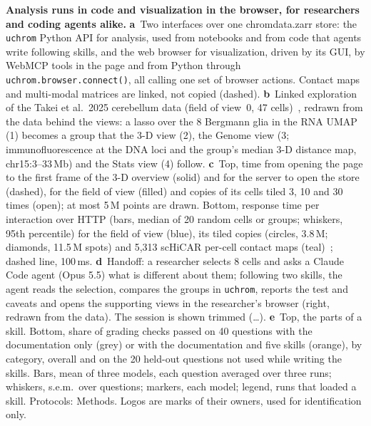 \textbf{Analysis runs in code and visualization in the browser, for researchers and coding agents alike.}
\textbf{a}~Two interfaces over one chromdata.zarr store: the \texttt{uchrom} Python API for analysis, used from notebooks and from code that agents write following skills, and the web browser for visualization, driven by its GUI, by WebMCP tools in the page and from Python through \texttt{uchrom.browser.connect()}, all calling one set of browser actions. Contact maps and multi-modal matrices are linked, not copied (dashed).
\textbf{b}~Linked exploration of the Takei et al.\ 2025 cerebellum data (field of view~0, 47 cells)~\citep{takei2025}, redrawn from the data behind the views: a lasso over the 8 Bergmann glia in the RNA UMAP (1) becomes a group that the 3-D view (2), the Genome view (3; immunofluorescence at the DNA loci and the group's median 3-D distance map, chr15:3--33\,Mb) and the Stats view (4) follow.
\textbf{c}~Top, time from opening the page to the first frame of the 3-D overview (solid) and for the server to open the store (dashed), for the field of view (filled) and copies of its cells tiled 3, 10 and 30 times (open); at most 5\,M points are drawn. Bottom, response time per interaction over HTTP (bars, median of 20 random cells or groups; whiskers, 95th percentile) for the field of view (blue), its tiled copies (circles, 3.8\,M; diamonds, 11.5\,M spots) and 5,313 scHiCAR per-cell contact maps (teal)~\citep{schicar}; dashed line, 100\,ms.
\textbf{d}~Handoff: a researcher selects 8 cells and asks a Claude Code agent (Opus 5.5) what is different about them; following two skills, the agent reads the selection, compares the groups in \texttt{uchrom}, reports the test and caveats and opens the supporting views in the researcher's browser (right, redrawn from the data). The session is shown trimmed (\ldots).
\textbf{e}~Top, the parts of a skill. Bottom, share of grading checks passed on 40 questions with the documentation only (grey) or with the documentation and five skills (orange), by category, overall and on the 20 held-out questions not used while writing the skills. Bars, mean of three models, each question averaged over three runs; whiskers, s.e.m.\ over questions; markers, each model; legend, runs that loaded a skill.
Protocols: Methods.
Logos are marks of their owners, used for identification only.

